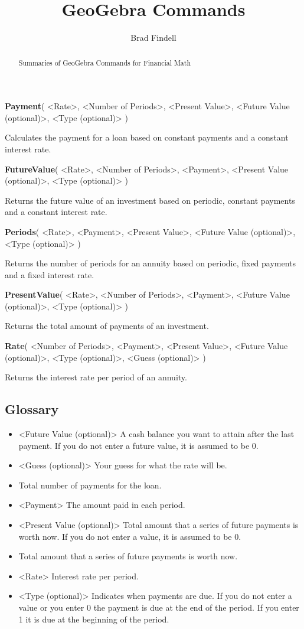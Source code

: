 \documentclass[handout,space,nooutcomes]{ximera}
\title{GeoGebra Commands}
\author{Brad Findell}
\begin{document}
\begin{abstract}
Summaries of GeoGebra Commands for Financial Math
\end{abstract}
\maketitle


\textbf{Payment}( <Rate>, <Number of Periods>, <Present Value>, <Future Value (optional)>, <Type (optional)> )

Calculates the payment for a loan based on constant payments and a constant interest rate.

\textbf{FutureValue}( <Rate>, <Number of Periods>, <Payment>, <Present Value (optional)>, <Type (optional)> )

Returns the future value of an investment based on periodic, constant payments and a constant interest rate.

\textbf{Periods}( <Rate>, <Payment>, <Present Value>, <Future Value (optional)>, <Type (optional)> )

Returns the number of periods for an annuity based on periodic, fixed payments and a fixed interest rate.

\textbf{PresentValue}( <Rate>, <Number of Periods>, <Payment>, <Future Value (optional)>, <Type (optional)> )

Returns the total amount of payments of an investment.

\textbf{Rate}( <Number of Periods>, <Payment>, <Present Value>, <Future Value (optional)>, <Type (optional)>, <Guess (optional)> )

Returns the interest rate per period of an annuity.

\subsection*{Glossary}
\begin{itemize}
\item <Future Value (optional)> A cash balance you want to attain after the last payment. If you do not enter a future value, it is assumed to be 0.
\item <Guess (optional)> Your guess for what the rate will be.
\item <Number of Periods> Total number of payments for the loan.
\item <Payment> The amount paid in each period.
\item <Present Value (optional)> Total amount that a series of future payments is worth now. If you do not enter a value, it is assumed to be 0.
\item <Present Value> Total amount that a series of future payments is worth now.
\item <Rate> Interest rate per period.
\item <Type (optional)> Indicates when payments are due. If you do not enter a value or you enter 0 the payment is due at the end of the period. If you enter 1 it is due at the beginning of the period.
\end{itemize}
\end{document}
